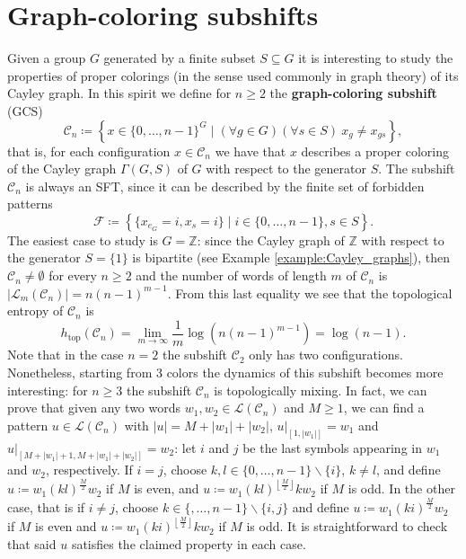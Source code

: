 \documentclass[letterpaper,10pt]{article}
\theoremstyle{plain}
\def\htop{h_{\mathrm{top}}}
\begin{document}
	\section{Graph-coloring subshifts}\label{section.graph_coloring_subshifts}
Given a group $G$ generated by a finite subset $S\subseteq G$ it is interesting to study the properties of proper colorings (in the sense used commonly in graph theory) of its Cayley graph. In this spirit we define for $n\ge 2$ the \textbf{graph-coloring subshift} (GCS)
$$
\mathcal{C}_{n}\coloneqq\left\{x\in \{0,\ldots,n-1\}^G\mid (\forall g\in G)(\forall s\in S)\ x_{g}\neq x_{gs} \right\},
$$
that is, for each configuration $x\in \mathcal{C}_{n}$ we have that $x$ describes a proper coloring of the Cayley graph $\Gamma(G,S)$ of $G$ with respect to the generator $S$. 
The subshift $\mathcal{C}_{n}$ is always an SFT, since it can be described by the finite set of forbidden patterns 
$$
\mathcal{F}\coloneqq \left\{ \{x_{e_G}=i,x_{s}=i\}\mid i\in \{0,\ldots,n-1\}, s\in S \right\}.
$$
The easiest case to study is $G=\mathbb{Z}$: since the Cayley graph of $\mathbb{Z}$ with respect to the generator $S=\{1\}$ is bipartite (see Example \ref{example:Cayley_graphs}), then $\mathcal{C}_n\neq \emptyset$ for every $n\ge 2$ and the number of words of length $m$ of $\mathcal{C}_{n}$ is $|\mathcal{L}_m(\mathcal{C}_{n})|=n(n-1)^{m-1}$. From this last equality we see that the topological entropy of $\mathcal{C}_n$ is 
$$\htop(\mathcal{C}_n)=\lim_{m\to \infty}\frac{1}{m}\log(n(n-1)^{m-1})=\log(n-1).$$
Note that in the case $n=2$ the subshift $\mathcal{C}_2$ only has two configurations. Nonetheless, starting from 3 colors the dynamics of this subshift becomes more interesting: for $n\ge 3$ the subshift $\mathcal{C}_n$ is topologically mixing. In fact, we can prove that given any two words $w_1,w_2\in \mathcal{L}(\mathcal{C}_n)$ and $M\ge 1$, we can find a pattern $u\in \mathcal{L}(\mathcal{C}_n)$ with $|u|=M+|w_1|+|w_2|$, $u|_{[1,|w_1|]}=w_1$ and $u|_{[M+|w_1|+1,M+|w_1|+|w_2|]}=w_2$: let $i$ and $j$ be the last symbols appearing in $w_1$ and $w_2$, respectively. If $i=j$, choose $k,l\in \{0,\ldots,n-1\}\backslash\{i\}$, $k\neq l$, and define $u\coloneqq w_1(kl)^\frac{M}{2}w_2$ if $M$ is even, and $u\coloneqq w_1(kl)^{\left\lfloor\frac{M}{2}\right\rfloor}kw_2$ if $M$ is odd. In the other case, that is if $i\neq j$, choose $k\in \{,\ldots,n-1\}\backslash\{i,j\}$ and define $u\coloneqq w_1(ki)^{\frac{M}{2}}w_2$ if $M$ is even and $u\coloneqq w_1(ki)^{\left\lfloor \frac{M}{2}\right \rfloor}kw_2$ if $M$ is odd. It is straightforward to check that said $u$ satisfies the claimed property in each case.
\end{document}
